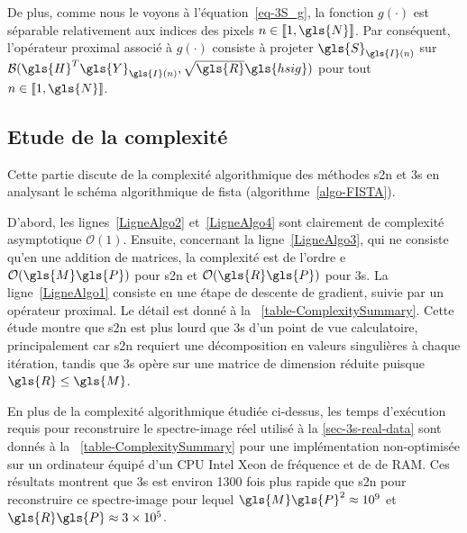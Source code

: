 De plus, comme nous le voyons à l'équation~\eqref{eq-3S_g}, la fonction $g(\cdot)$ est séparable relativement aux indices des pixels $n \in \llbracket 1,\gls{N}\rrbracket$. Par conséquent, l'opérateur proximal associé à $g(\cdot)$ consiste à projeter $\gls{S}_{\gls{I}(n)}$ sur $\mathcal{B}(\gls{H}^T\gls{Y}_{\gls{I}(n)},\sqrt{\gls{R}}\gls{hsig})$ pour tout $n\in \llbracket 1,\gls{N}\rrbracket$.

\subsection{Etude de la complexité}

Cette partie discute de la complexité algorithmique des méthodes \gls{s2n} et \gls{3s} en analysant le schéma algorithmique de \gls{fista} (algorithme~\ref{algo-FISTA}).

D'abord, les lignes~\ref{LigneAlgo2} et~\ref{LigneAlgo4} sont clairement de complexité asymptotique $\mathcal{O}(1)$. Ensuite, concernant la ligne~\ref{LigneAlgo3}, qui ne consiste qu'en une addition de matrices, la complexité est de l'ordre e $\mathcal{O}(\gls{M}\gls{P})$ pour \gls{s2n} et $\mathcal{O}(\gls{R}\gls{P})$ pour \gls{3s}. La ligne~\ref{LigneAlgo1} consiste en une étape de descente de gradient, suivie par un opérateur proximal. Le détail est donné à la \tabname~\ref{table-ComplexitySummary}. Cette étude montre que \gls{s2n} est plus lourd que \gls{3s} d'un point de vue calculatoire, principalement car \gls{s2n} requiert une décomposition en valeurs singulières à chaque itération, tandis que \gls{3s} opère sur une matrice de dimension réduite puisque $\gls{R} \leq \gls{M}$.

En plus de la complexité algorithmique étudiée ci-dessus, les temps d'exécution requis pour reconstruire le spectre-image réel utilisé à la \cref{sec-3s-real-data} sont donnés à la \tabname~\ref{table-ComplexitySummary} pour une implémentation non-optimisée sur un ordinateur équipé d'un CPU Intel Xeon de fréquence  et de  de RAM. Ces résultats montrent que \gls{3s} est environ 1300 fois plus rapide que \gls{s2n} pour reconstruire ce spectre-image pour lequel $\gls{M}\gls{P}^2 \approx 10^9$ et $\gls{R}\gls{P} \approx 3\times 10^5$.

